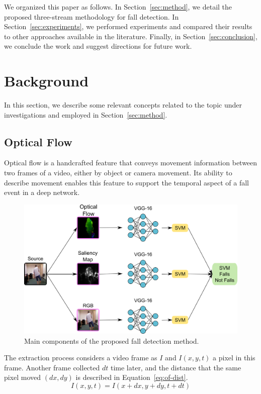 \documentclass[conference]{IEEEtran}
\begin{document}
We organized this paper as follows. In Section~\ref{sec:method}, we detail the proposed three-stream methodology for fall detection. In Section~\ref{sec:experiments}, we performed experiments and compared their results to other approaches available in the literature. Finally, in Section~\ref{sec:conclusion}, we conclude the work and suggest directions for future work.

\section{Background}
\label{background}

In this section, we describe some relevant concepts related to the topic under investigations and employed in Section~\ref{sec:method}.

\subsection{Optical Flow}
\label{sec:opticalflow}

Optical flow is a handcrafted feature that conveys movement information between two frames of a video, either by object or camera movement. Its ability to describe movement enables this feature to support the temporal aspect of a fall event in a deep network.

\begin{figure}[!htb]
\centerline{\includegraphics[width=0.55\linewidth]{figures/overview.png}}
\caption{Main components of the proposed fall detection method.}
\label{fig:overview}
\end{figure}

The extraction process considers a video frame as $I$ and $I(x, y, t)$ a pixel in this frame. Another frame collected $dt$ time later, and the distance that the same pixel moved $(dx, dy)$ is described in Equation~\ref{eq:of-dist}.
\begin{equation}
\label{eq:of-dist}
I(x, y, t)=I(x+dx, y+dy, t+dt)
\end{equation}
\end{document}
